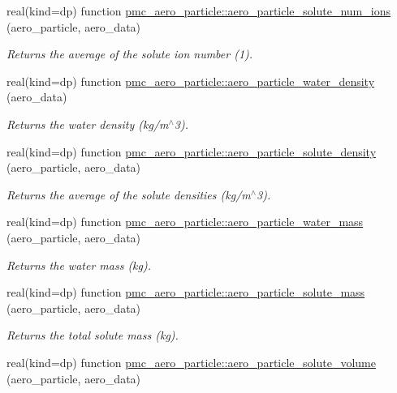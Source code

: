 \begin{DoxyCompactItemize}
real(kind=dp) function \mbox{\hyperlink{namespacepmc__aero__particle_a2dd738f45ba93c98a48e63b4486ae752}{pmc\+\_\+aero\+\_\+particle\+::aero\+\_\+particle\+\_\+solute\+\_\+num\+\_\+ions}} (aero\+\_\+particle, aero\+\_\+data)
\begin{DoxyCompactList}\small\item\em Returns the average of the solute ion number (1). \end{DoxyCompactList}\item 
real(kind=dp) function \mbox{\hyperlink{namespacepmc__aero__particle_acb938c761ee8d337f085cce45cc64ca6}{pmc\+\_\+aero\+\_\+particle\+::aero\+\_\+particle\+\_\+water\+\_\+density}} (aero\+\_\+data)
\begin{DoxyCompactList}\small\item\em Returns the water density (kg/m$^\wedge$3). \end{DoxyCompactList}\item 
real(kind=dp) function \mbox{\hyperlink{namespacepmc__aero__particle_a10b8893d9fe31aaf0de1f98f22003c71}{pmc\+\_\+aero\+\_\+particle\+::aero\+\_\+particle\+\_\+solute\+\_\+density}} (aero\+\_\+particle, aero\+\_\+data)
\begin{DoxyCompactList}\small\item\em Returns the average of the solute densities (kg/m$^\wedge$3). \end{DoxyCompactList}\item 
real(kind=dp) function \mbox{\hyperlink{namespacepmc__aero__particle_a90baff859a7a0ee039750d2f7db6f9e5}{pmc\+\_\+aero\+\_\+particle\+::aero\+\_\+particle\+\_\+water\+\_\+mass}} (aero\+\_\+particle, aero\+\_\+data)
\begin{DoxyCompactList}\small\item\em Returns the water mass (kg). \end{DoxyCompactList}\item 
real(kind=dp) function \mbox{\hyperlink{namespacepmc__aero__particle_a6093b9c44631f9634430d8ced41985b1}{pmc\+\_\+aero\+\_\+particle\+::aero\+\_\+particle\+\_\+solute\+\_\+mass}} (aero\+\_\+particle, aero\+\_\+data)
\begin{DoxyCompactList}\small\item\em Returns the total solute mass (kg). \end{DoxyCompactList}\item 
real(kind=dp) function \mbox{\hyperlink{namespacepmc__aero__particle_ae33468d919702d9e8cc26940cb804fcf}{pmc\+\_\+aero\+\_\+particle\+::aero\+\_\+particle\+\_\+solute\+\_\+volume}} (aero\+\_\+particle, aero\+\_\+data)

\end{DoxyCompactItemize}
